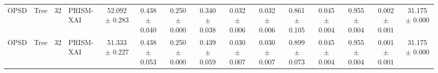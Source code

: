 \begin{table}[t]
\begin{tabular}{llllccccccccccc}
OPSD & Tree & 32 & PRISM-XAI & 52.092 $\pm$ 0.283 & 0.438 $\pm$ 0.040 & 0.250 $\pm$ 0.000 & 0.340 $\pm$ 0.038 & 0.032 $\pm$ 0.006 & 0.032 $\pm$ 0.006 & 0.861 $\pm$ 0.105 & 0.045 $\pm$ 0.004 & 0.955 $\pm$ 0.004 & 0.002 $\pm$ 0.001 & 31.175 $\pm$ 0.000 \\
OPSD & Tree & 32 & PRISM-XAI & 51.333 $\pm$ 0.227 & 0.438 $\pm$ 0.053 & 0.250 $\pm$ 0.000 & 0.439 $\pm$ 0.059 & 0.030 $\pm$ 0.007 & 0.030 $\pm$ 0.007 & 0.899 $\pm$ 0.073 & 0.045 $\pm$ 0.004 & 0.955 $\pm$ 0.004 & 0.001 $\pm$ 0.001 & 31.175 $\pm$ 0.000 \\
\bottomrule
\end{tabular}
\end{table}
